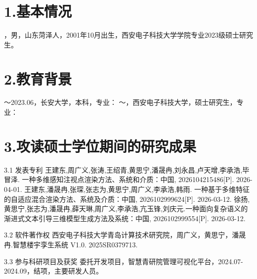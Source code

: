 \begin{resume}
    \section*{1.\hspace{0.75em}基本情况}
    ，男，山东菏泽人，2001年10月出生，西安电子科技大学学院专业2023级硕士研究生。
    \section*{2.\hspace{0.75em}教育背景}
    \begin{resumelist*}
        ～2023.06，长安大学，本科，专业：
        ～\phantom{2025.07}，西安电子科技大学，硕士研究生，专业：
    \end{resumelist*}
    \section*{3.\hspace{0.75em}攻读硕士学位期间的研究成果}
    \begin{resumelist}{\hspace{-0.25em}3.1\hspace{0.5em} 发表专利}
        \resumelistitem
        王建东,周广义,张涛,王绍青,黄思宁,潘晟冉,刘永昌,卢天增,李承浩,毕冒泽. 一种多维感知注视点渲染方法、系统和介质：中国, 2026104215486[P]. 2026-04-01.
        \resumelistitem
        王建东,潘晟冉,张琛,张志为,黄思宁,周广义,李承浩,韩雨. 一种基于多维特征的自适应混合渲染方法、系统及介质：中国, 2026102999624[P]. 2026-03-12.
        \resumelistitem
        徐扬,黄思宁,张志为,潘晟冉,薛天琳,周广义,李承浩,亢玉锋,刘庆元.一种面向复杂语义的渐进式文本引导三维模型生成方法及系统：中国, 2026102999554[P]. 2026-03-12.
    \end{resumelist}
    \begin{resumelist}{\hspace{-0.25em}3.2\hspace{0.5em} 软件著作权}
        \resumelistitem
        西安电子科技大学青岛计算技术研究院，周广义，黄思宁，潘晟冉.智慧楼宇孪生系统 V1.0. 2025SR0379713.
    \end{resumelist}
    \begin{resumelist}{\hspace{-0.25em}3.3\hspace{0.5em} 参与科研项目及获奖} 
        \resumelistitem 委托开发项目，智慧青研院管理可视化平台，2024.07-2024.09，结项，主要研发人员。


\end{resumelist}
\end{resume}
